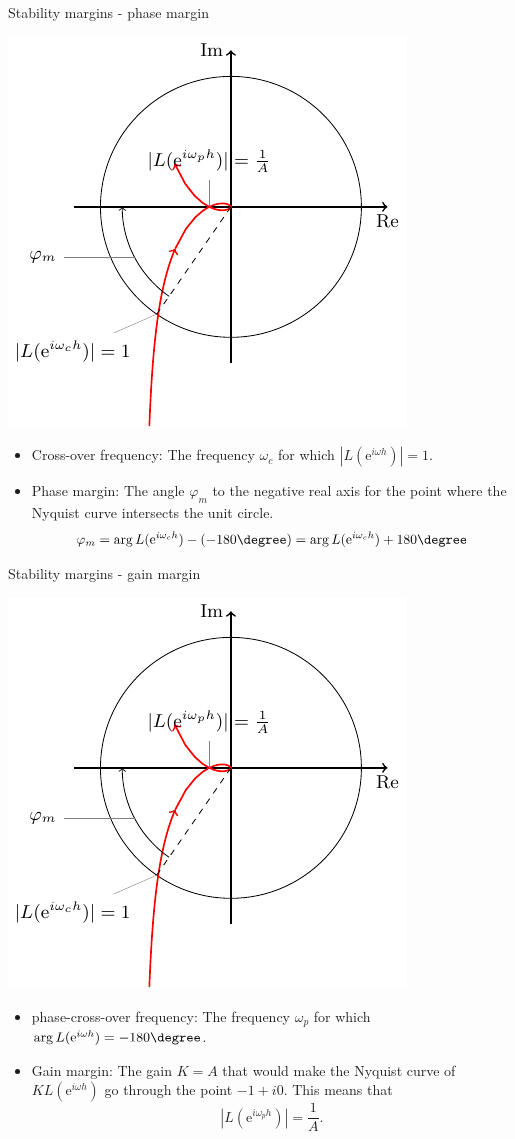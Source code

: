 \documentclass[presentation,aspectratio=169]{beamer}
\begin{document}
\begin{frame}[label=sec-5-3]{Stability margins - phase margin}
\begin{center}
\includegraphics[width=0.38\linewidth]{../../figures/implane-nyquist-margins}
\end{center}
\begin{itemize}
\item Cross-over frequency: The frequency \(\omega_c\) for which \(|L(\mathrm{e}^{i\omega h})| = 1\).
\item Phase margin: The angle \(\varphi_m\) to the negative real axis for the point where the Nyquist curve intersects the unit circle. \[\varphi_m = \arg L(\mathrm{e}^{i\omega_c h}) - (-180\degree) = \arg L(\mathrm{e}^{i\omega_c h}) + 180\degree\]
\end{itemize}
\end{frame}

\begin{frame}[label=sec-5-4]{Stability margins - gain margin}
\begin{center}
\includegraphics[width=0.34\linewidth]{../../figures/implane-nyquist-margins}
\end{center}
\begin{itemize}
\item phase-cross-over frequency: The frequency \(\omega_p\) for which \(\arg L(\mathrm{e}^{i\omega h}) = -180\degree\).
\item Gain margin: The gain $K=A$ that would make the Nyquist curve of \(K L(\mathrm{e}^{i\omega h})\) go through the point \(-1 + i0\). This means that \[ |L(\mathrm{e}^{i\omega_p h})| = \frac{1}{A}. \]
\end{itemize}
\end{frame}
\end{document}
